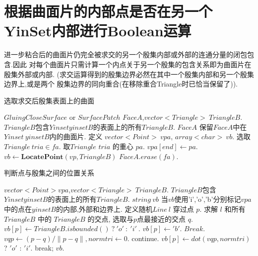\documentclass[a4paper]{book}
\renewcommand{\algorithmicrequire}{\textbf{输入:}}
\renewcommand{\algorithmicensure}{\textbf{输出:}}
\renewcommand{\algorithmicrequire}{\textbf{Input : }}
\renewcommand{\algorithmicrequire}{\textbf{Precondition : }}
\renewcommand{\algorithmicensure}{\textbf{Output : }}
\renewcommand{\algorithmicensure}{\textbf{Postcondition : }}
\numberwithin{equation}{chapter}
\theoremstyle{definition}
\begin{document}
\section{根据曲面片的内部点是否在另一个YinSet内部进行Boolean运算}
进一步粘合后的曲面片仍完全被求交的另一个殷集内部或外部的连通分量的闭包包含.因此
对每个曲面片只需计算一个内点关于另一个殷集的包含关系即为曲面片在殷集外部或内部.
(求交运算得到的殷集边界必然在其中一个殷集内部和另一个殷集边界上,或是两个
殷集边界的同向重合(在移除重合Triangle时已恰当保留了)).

\begin{algorithm}
	\caption{选取求交后殷集表面上的曲面}
	\begin{algorithmic}[1]
		\renewcommand{\algorithmicrequire}{\textbf{Input : }}
		\Require $GluingCloseSurface$ or $SurfacePatch$ $FaceA$,$vector<Triangle>\ TriangleB$.
		\renewcommand{\algorithmicrequire}{\textbf{Precondition : }}
		\Require $TriangleB$包含$Yinset yinsetB$的表面上的所有$TriangleB$.
		\renewcommand{\algorithmicensure}{\textbf{Output : }}
		\Ensure $FaceA$
		\renewcommand{\algorithmicensure}{\textbf{Postcondition : }}
		\Ensure 保留$FaceA$中在$Yinset\ yinsetB$内的曲面片.
		\State 定义 $vector<Point>\ vpa$, $array<char>\ vb$.
		\State 选取 $Triangle\ tria \in fa$.
		\State 取$Triangle$ $tria$ 的重心 $pa$.
		\State $vpa[end] \gets pa$.
		\EndFor
		\State $vb \gets \textbf{LocatePoint}(vp,TriangleB)$
		\State $FaceA.erase(fa)$.
		\EndIf
		\EndFor
		\EndFunction
	\end{algorithmic}
\end{algorithm}


\begin{algorithm}
	\caption{判断点与殷集之间的位置关系}
	\begin{algorithmic}[1]
		\renewcommand{\algorithmicrequire}{\textbf{Input : }}
		\Require $vector<Point> vpa $,$vector<Triangle>\ TriangleB$.
		\renewcommand{\algorithmicrequire}{\textbf{Precondition : }}
		\Require $TriangleB$包含$Yinset yinsetB$的表面上的所有$TriangleB$.
		\renewcommand{\algorithmicensure}{\textbf{Output : }}
		\Ensure $string\ vb$
		\renewcommand{\algorithmicensure}{\textbf{Postcondition : }}
		\Ensure 当$vb$使用'i','o','b'分别标记$vpa$中的点在$yinsetB$的内部,外部和边界上.
		\State 定义随机$Line\ l$ 穿过点 $p$.
		\State 求解 $l$ 和所有 $TriangleB$ 中的 $TriangleB$ 的交点, 
		选取与$p$点最接近的交点 $q$.
        \State $vb[p] \gets TriangleB.isbounded()\ ?\ 'o'\ :\ 'i'\ $.
        \EndIf
		\State $vb[p] \gets 'b'$.
		\State $Break$.
		\EndIf
		\State $vqp \gets (p - q)/ \lVert p - q \rVert,normtri \gets 0$.
        \State continue.
        \EndIf
		\State $vb[p] \gets dot(vqp,normtri) $ ? $ 'o' $ : $ 'i' $.
        \State break;
        \EndWhile
		\EndFor
		\State \Return $vb$.
		\EndFunction
	\end{algorithmic}
\end{algorithm}
\end{document}
